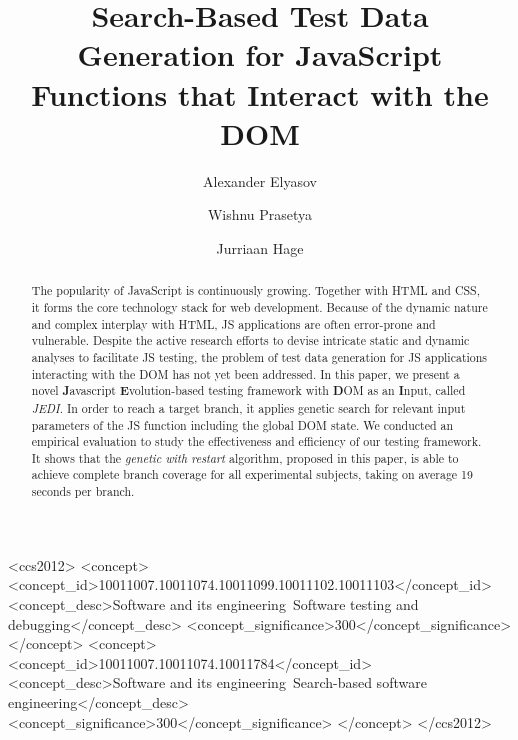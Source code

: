 \documentclass[sigconf,review]{acmart}
\begin{document}
\title[Search-Based Test Data Generation for JavaScript Functions...]{Search-Based Test Data Generation for JavaScript Functions that Interact with the DOM}


\author{Alexander Elyasov}

\author{Wishnu Prasetya}

\author{Jurriaan Hage}


\begin{abstract}
The popularity of JavaScript is continuously growing. Together with HTML and CSS, it forms the core technology stack for web development. Because of the dynamic nature and complex interplay with HTML, JS applications are often error-prone and vulnerable. Despite the active research efforts to devise intricate static and dynamic analyses to facilitate JS testing, the problem of test data generation for JS applications interacting with the DOM has not yet been addressed. In this paper, we present a novel \textbf{J}avascript \textbf{E}volution-based testing framework with \textbf{D}OM as an \textbf{I}nput, called \emph{JEDI}. In order to reach a target branch, it applies genetic search for relevant input parameters of the JS function including the global DOM state. We conducted an empirical evaluation to study the effectiveness and efficiency of our testing framework. It shows that the \emph{genetic with restart} algorithm, proposed in this paper, is able to achieve complete branch coverage for all experimental subjects, taking on average 19 seconds per branch.
\end{abstract}

%
%
\begin{CCSXML}
<ccs2012>
<concept>
<concept_id>10011007.10011074.10011099.10011102.10011103</concept_id>
<concept_desc>Software and its engineering~Software testing and debugging</concept_desc>
<concept_significance>300</concept_significance>
</concept>
<concept>
<concept_id>10011007.10011074.10011784</concept_id>
<concept_desc>Software and its engineering~Search-based software engineering</concept_desc>
<concept_significance>300</concept_significance>
</concept>
</ccs2012>
\end{CCSXML}
\end{document}
